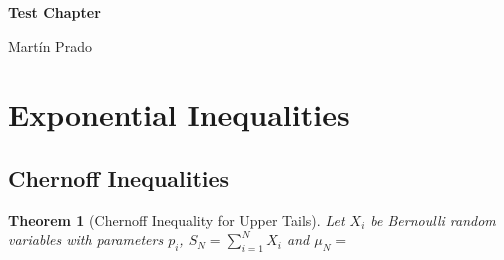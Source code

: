 \documentclass[12pt]{exam}
\def\1{\ensuremath{\mathds{1}}}
\def\E{\ensuremath{\mathbf{E}}}
\def\P{\ensuremath{\mathbf{P}}}
\newtheorem{theorem}{Theorem}[section]
\theoremstyle{remark}
\begin{document}
\vspace*{-2em}

\begin{center}
 
  {\Large\sffamily\bfseries Test Chapter}

\end{center}
\begin{center}
Martín Prado 
\end{center}
\vspace{10pt}






\section*{Exponential Inequalities}


\subsection*{Chernoff Inequalities}

\begin{theorem}[Chernoff Inequality for Upper Tails]
Let $X_i$ be Bernoulli random variables with parameters $p_i$, $S_N = \sum_{i = 1}^N X_i$ and $\mu_N = $
\end{theorem}
\end{document}
